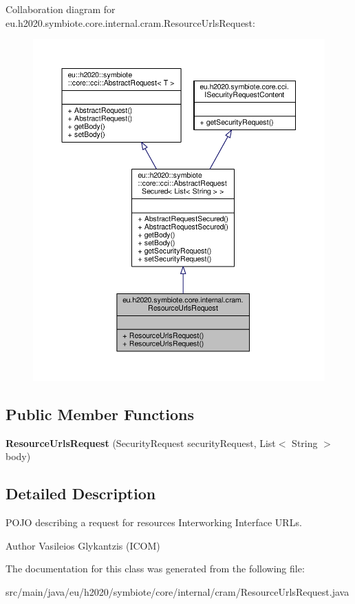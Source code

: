 Collaboration diagram for eu.\+h2020.\+symbiote.\+core.\+internal.\+cram.\+Resource\+Urls\+Request\+:\nopagebreak
\begin{figure}[H]
\begin{center}
\leavevmode
\includegraphics[width=350pt]{classeu_1_1h2020_1_1symbiote_1_1core_1_1internal_1_1cram_1_1ResourceUrlsRequest__coll__graph}
\end{center}
\end{figure}
\subsection*{Public Member Functions}
\begin{DoxyCompactItemize}
\item 
\mbox{\label{classeu_1_1h2020_1_1symbiote_1_1core_1_1internal_1_1cram_1_1ResourceUrlsRequest_a55e1abb2a3ef75adb9db136badb45db9}} 
{\bfseries Resource\+Urls\+Request} (Security\+Request security\+Request, List$<$ String $>$ body)
\end{DoxyCompactItemize}


\subsection{Detailed Description}
P\+O\+JO describing a request for resources\textquotesingle{} Interworking Interface U\+R\+Ls. \begin{DoxyAuthor}{Author}
Vasileios Glykantzis (I\+C\+OM) 
\end{DoxyAuthor}


The documentation for this class was generated from the following file\+:\begin{DoxyCompactItemize}
\item 
src/main/java/eu/h2020/symbiote/core/internal/cram/Resource\+Urls\+Request.\+java\end{DoxyCompactItemize}
